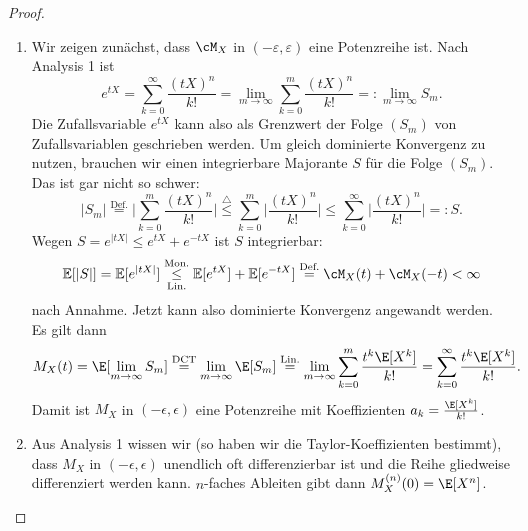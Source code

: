


\marginpar{\textcolor{red}{Vorlesung 16}}

\begin{proof}\abs
	\begin{enumerate}[label=(\alph*)]
		\item Wir zeigen zun\"achst, dass $\cM_X$ in $(-\varepsilon,\varepsilon)$ eine Potenzreihe ist. Nach Analysis 1 ist 
		\[ e^{tX} = \sum\limits_{k=0}^{\infty} \frac{(tX)^n}{k!} = \lim\limits_{m \to \infty} \sum\limits_{k=0}^{m} \frac{(tX)^n}{k!} =: \lim\limits_{m \to \infty} S_m. \]
		Die Zufallsvariable $e^{tX}$ kann also als Grenzwert der Folge $(S_m)$ von Zufallsvariablen geschrieben werden. Um gleich dominierte Konvergenz zu nutzen, brauchen wir einen integrierbare Majorante $S$ f\"ur die Folge $(S_m)$. Das ist gar nicht so schwer: \[ |S_m| \overset{\text{Def.}}{=} \Big|\sum\limits_{k=0}^{m} \frac{(tX)^n}{k!} \Big| \overset{\triangle}{\leq} 
		\sum\limits_{k=0}^{m} \Big| \frac{(tX)^n}{k!} \Big| \leq \sum\limits_{k=0}^{\infty} \Big| \frac{(tX)^n}{k!} \Big| =: S.
		\]
		Wegen $S=e^{|tX|} \leq e^{tX} + e^{-tX}$ ist $S$ integrierbar:
		\[ \mathbb{E}[|S|] = \mathbb{E}[e^{|tX|}] \overset{\text{Mon.}}{\underset{\text{Lin.}}{\leq}} \mathbb{E}[e^{tX}] + \mathbb{E}[e^{-tX}] \overset{\text{Def.}}{=} \cM_X(t) + \cM_X(-t) < \infty
		\]
		nach Annahme. Jetzt kann also dominierte Konvergenz angewandt werden. Es gilt dann
		\begin{align*}
		M_X(t)=\E[\lim_{m\to\infty} S_m] \overset{\text{DCT}}{=} \lim_{m\to\infty} \E[S_m]\overset {\text{Lin.}}{=} \lim_{m\to\infty} \sum_{k=0}^m\frac{t^k \E[X^k]}{k!}=\sum_{k=0}^\infty\frac{t^k \E[X^k]}{k!}.
		\end{align*}
		Damit ist $M_X$ in $(-\epsilon,\epsilon)$ eine Potenzreihe mit Koeffizienten $a_k=\frac{\E[X^k]}{k!}$. 
		\item	Aus Analysis 1 wissen wir (so haben wir die Taylor-Koeffizienten bestimmt), dass $M_X$ in $(-\epsilon, \epsilon)$ unendlich oft differenzierbar ist und die Reihe gliedweise differenziert werden kann. $n$-faches Ableiten gibt dann $M_X^{(n)}(0)=\E[X^n]$.
	\end{enumerate}
\end{proof}

